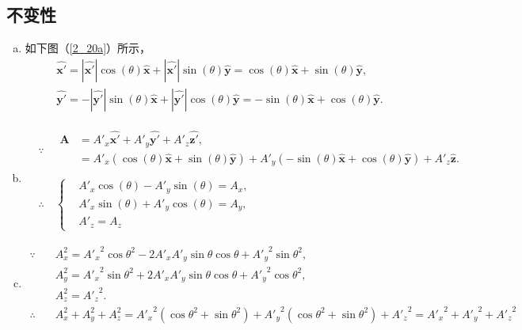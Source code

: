 \subsection{不变性}
\begin{enumerate}[(a)]
	\item
	如下图（\ref{2_20a}）所示，
	\[
	\begin{aligned}
	&\bm{\hat{x'}} = |\bm{\hat{x'}}|\cos(\theta)\bm{\hat{x}} + |\bm{\hat{x'}}|\sin(\theta)\bm{\hat{y}} = \cos(\theta)\bm{\hat{x}} + \sin(\theta)\bm{\hat{y}},\\
	&\bm{\hat{y'}} = -|\bm{\hat{y'}}|\sin(\theta)\bm{\hat{x}} + |\bm{\hat{y'}}|\cos(\theta)\bm{\hat{y}} =
	- \sin(\theta)\bm{\hat{x}} + \cos(\theta)\bm{\hat{y}}.
\end{aligned}
	\]
	\item
	\[
	\begin{aligned}
	&\because \quad
	\begin{aligned}
	\bm{A}
	&= A'_x\bm{\hat{x'}} + A'_y\bm{\hat{y'}} + A'_z\bm{\hat{z'}},\\
	&=A'_x(\cos(\theta)\bm{\hat{x}} + \sin(\theta)\bm{\hat{y}}) + A'_y(- \sin(\theta)\bm{\hat{x}} + \cos(\theta)\bm{\hat{y}}) + A'_z\bm{\hat{z}}. \\
\end{aligned} \\
	&\therefore \quad
	\left\{
	\begin{aligned}
	&A'_x\cos(\theta) - A'_y\sin(\theta) = A_x, \\
	&A'_x\sin(\theta) + A'_y\cos(\theta) = A_y, \\
	&A'_z = A_z
\end{aligned}
	\right.
\end{aligned}
	\]
	\item
	\[
	\begin{aligned}
	\because \quad
	&A_x^2 = {A'_x}^2\cos\theta^2 - 2A'_xA'_y\sin\theta\cos\theta + {A'_y}^2\sin\theta^2, \\
	&A_y^2 = {A'_x}^2\sin\theta^2 + 2A'_xA'_y\sin\theta\cos\theta + {A'_y}^2\cos\theta^2, \\
	&A_z^2 = {A'_z}^2. \\
	\therefore \quad
	&A_x^2 + A_y^2 + A_z^2 ={ A'_x}^2(\cos\theta^2 + \sin\theta^2) +  {A'_y}^2(\cos\theta^2 + \sin\theta^2) + {A'_z}^2 = {A'_x}^2 +{ A'_y}^2 +{ A'_z}^2
\end{aligned}
	\]
\end{enumerate}


